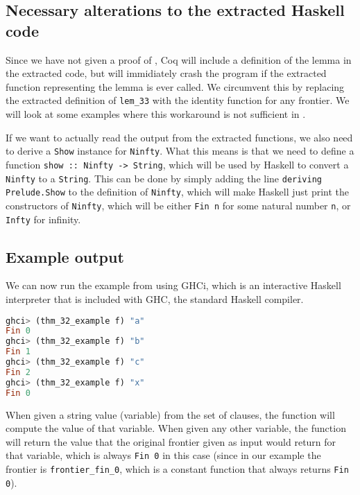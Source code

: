 \subsection{Necessary alterations to the extracted Haskell code}
\label{sec:necessary_alterations}

Since we have not given a proof of , Coq will include a definition of the lemma in the extracted code,
but will immidiately crash the program if the extracted function representing the lemma is ever called.
We circumvent this by replacing the extracted definition of \lstinline{lem_33} with the identity function
for any frontier. We will look at some examples where this workaround is not sufficient in
.

If we want to actually read the output from the extracted functions, we also need to
derive a \lstinline{Show} instance for \lstinline{Ninfty}.
What this means is that we need to define a function \lstinline{show :: Ninfty -> String},
which will be used by Haskell to convert a \lstinline{Ninfty} to a \lstinline{String}.
This can be done by simply adding the line \lstinline{deriving Prelude.Show} to the definition of \lstinline{Ninfty},
which will make Haskell just print the constructors of \lstinline{Ninfty},
which will be either \lstinline{Fin n} for some natural number \lstinline{n},
or \lstinline{Infty} for infinity.

\subsection{Example output}
\label{sssec:example_output}

We can now run the example from  using GHCi,
which is an interactive Haskell interpreter that is included with GHC, the standard Haskell compiler.

\begin{minipage}{\linewidth}
\begin{lstlisting}[language=Haskell, label={lst:thm_32_haskell_output}, caption={\lstinline{thm_32} example output}]
ghci> (thm_32_example f) "a"
Fin 0
ghci> (thm_32_example f) "b"
Fin 1
ghci> (thm_32_example f) "c"
Fin 2
ghci> (thm_32_example f) "x"
Fin 0
\end{lstlisting}
\end{minipage}

When given a string value (variable) from the set of clauses, the function will compute the value of that variable.
When given any other variable, the function will return the value that the original frontier given as input
would return for that variable, which is always \lstinline{Fin 0} in this case
(since in our example the frontier is \lstinline{frontier_fin_0},
which is a constant function that always returns \lstinline{Fin 0}).

